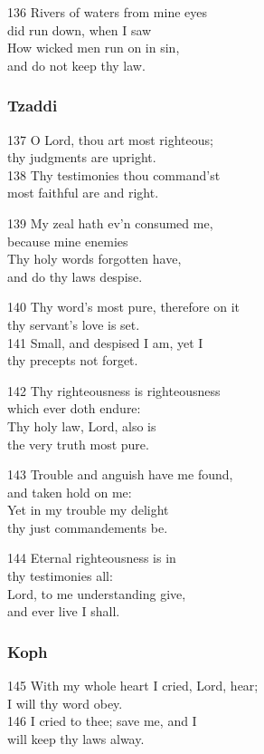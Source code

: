 \begin{multicols}{3}
136 Rivers of waters from mine eyes\\
did run down, when I saw\\
How wicked men run on in sin,\\
and do not keep thy law.

\subsubsection*{Tzaddi}

137 O Lord, thou art most righteous;\\
thy judgments are upright.\\
138 Thy testimonies thou command’st\\
most faithful are and right.

139 My zeal hath ev’n consumed me,\\
because mine enemies\\
Thy holy words forgotten have,\\
and do thy laws despise.

140 Thy word’s most pure, therefore on it\\
thy servant’s love is set.\\
141 Small, and despised I am, yet I\\
thy precepts not forget.

142 Thy righteousness is righteousness\\
which ever doth endure:\\
Thy holy law, Lord, also is\\
the very truth most pure.

143 Trouble and anguish have me found,\\
and taken hold on me:\\
Yet in my trouble my delight\\
thy just commandements be.

144 Eternal righteousness is in\\
thy testimonies all:\\
Lord, to me understanding give,\\
and ever live I shall.

\subsubsection*{Koph}

145 With my whole heart I cried, Lord, hear;\\
I will thy word obey.\\
146 I cried to thee; save me, and I\\
will keep thy laws alway.


\end{multicols}
